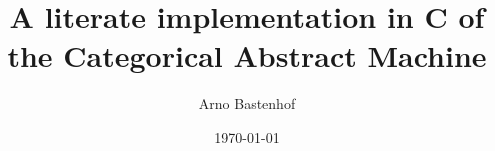 \documentclass{book}
\begin{document}
\title{A literate implementation in C of the Categorical Abstract Machine}
\author{Arno Bastenhof}
\date{\today}
\maketitle

\tableofcontents















\end{document}
